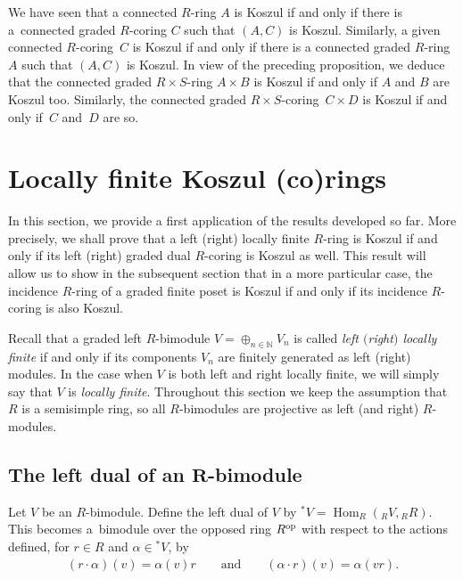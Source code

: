 \documentclass[pdftex]{sigma}
\renewcommand{\^}[1]{\mbox{$^{\left( #1 \right)}$}}
\renewcommand{\_}[1]{\mbox{$_{\left( #1 \right)}$}}
\newcommand{\N}{{\mathbb N}}
\numberwithin{equation}{section}
\begin{document}
\begin{Remark}
We have seen that a connected $R$-ring $A$ is Koszul if and only if there is a~connected graded $R$-coring $C$ such that $(A,C)$ is Koszul. Similarly, a given connected $R$-co\-ring~$C$ is Koszul if and only if there is a connected graded $R$-ring $A$ such that $(A,C)$ is Koszul. In view of the preceding proposition, we deduce that the connected graded $R\times S$-ring $A\times B$ is Koszul if and only if $A$ and $B$ are Koszul too. Similarly, the connected graded $R\times S$-co\-ring~$C\times D$ is Koszul if and only if~$C$ and~$D$ are so.
\end{Remark}

\section{Locally f\/inite Koszul (co)rings}\label{section5}

In this section, we provide a f\/irst application of the results developed so far. More precisely, we shall prove that a left (right) locally f\/inite $R$-ring is Koszul if and only if its left (right) graded dual $R$-coring is Koszul as well. This result will allow us to show in the subsequent section that in a more particular case, the incidence $R$-ring of a graded f\/inite poset is Koszul if and only if its incidence $R$-coring is also Koszul.

Recall that a graded left $R$-bimodule $V=\oplus_{n\in\N} V_n$ is called \emph{left $($right$)$ locally finite} if and only if its components $V_n$ are f\/initely generated as left (right) modules. In the case when $V$ is both left and right locally f\/inite, we will simply say that $V$ is \emph{locally finite}. Throughout this section we keep the assumption that $R$ is a semisimple ring, so all $R$-bimodules are projective as left (and right) $R$-modules.

\subsection[The left dual of an $R$-bimodule]{The left dual of an $\boldsymbol{R}$-bimodule}
 Let $V$ be an $R$-bimodule. Def\/ine the left dual of $V$ by $^*V=\operatorname{Hom}_R(_RV,{}_RR)$. This becomes a~bi\-module over the opposed ring $R^{\rm op}$ with respect to the actions def\/ined, for $ r\in R$ and $\alpha \in {^*V}$, by
\begin{gather*} (r\cdot \alpha)(v)=\alpha(v) r \qquad \text{and} \qquad (\alpha \cdot r)(v)=\alpha(vr).\end{gather*}
\end{document}
